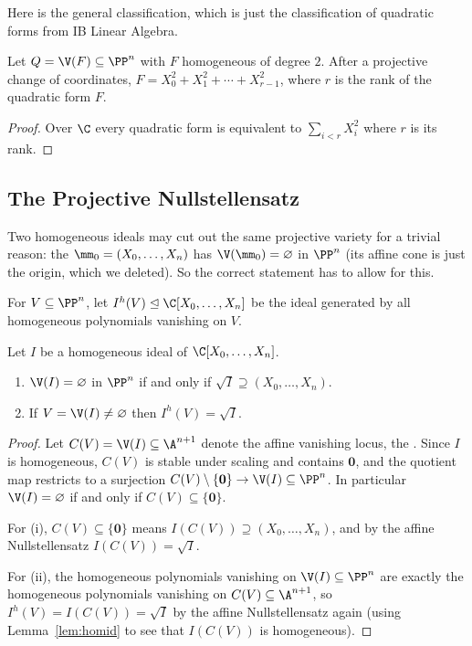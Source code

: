 Here is the general classification, which is just the classification of quadratic forms from IB Linear Algebra.

\begin{theorem}
	Let $Q = \V(F) \subseteq \PP^n$ with $F$ homogeneous of degree $2$. After a projective change of coordinates, $F = X_0^2 + X_1^2 + \cdots + X_{r-1}^2$, where $r$ is the rank of the quadratic form $F$.
\end{theorem}

\begin{proof}
	Over $\C$ every quadratic form is equivalent to $\sum_{i<r} X_i^2$ where $r$ is its rank.
\end{proof}

\subsection{The Projective Nullstellensatz}

Two homogeneous ideals may cut out the same projective variety for a trivial reason: the  $\mm_0 = (X_0,\dots,X_n)$ has $\V(\mm_0) = \varnothing$ in $\PP^n$ (its affine cone is just the origin, which we deleted). So the correct statement has to allow for this.

\begin{definition}
	For $V \subseteq \PP^n$, let $I^h(V) \trianglelefteq \C[X_0,\dots,X_n]$ be the ideal generated by all homogeneous polynomials vanishing on $V$.
\end{definition}

\begin{theorem}
	Let $I$ be a homogeneous ideal of $\C[X_0,\dots,X_n]$.
	\begin{enumerate}[label=(\roman*)]
		\item $\V(I) = \varnothing$ in $\PP^n$ if and only if $\sqrt I \supseteq (X_0,\dots,X_n)$.
		\item If $V = \V(I) \neq \varnothing$ then $I^h(V) = \sqrt I$.
	\end{enumerate}
\end{theorem}

\begin{proof}
	Let $C(V) = \V(I) \subseteq \A^{n+1}$ denote the affine vanishing locus, the . Since $I$ is homogeneous, $C(V)$ is stable under scaling and contains $\mathbf 0$, and the quotient map restricts to a surjection $C(V)\setminus\{\mathbf 0\} \to \V(I) \subseteq \PP^n$. In particular $\V(I) = \varnothing$ if and only if $C(V) \subseteq \{\mathbf 0\}$.

	For (i), $C(V) \subseteq \{\mathbf 0\}$ means $I(C(V)) \supseteq (X_0,\dots,X_n)$, and by the affine Nullstellensatz $I(C(V)) = \sqrt I$.

	For (ii), the homogeneous polynomials vanishing on $\V(I) \subseteq \PP^n$ are exactly the homogeneous polynomials vanishing on $C(V) \subseteq \A^{n+1}$, so $I^h(V) = I(C(V)) = \sqrt I$ by the affine Nullstellensatz again (using Lemma~\ref{lem:homid} to see that $I(C(V))$ is homogeneous).
\end{proof}

